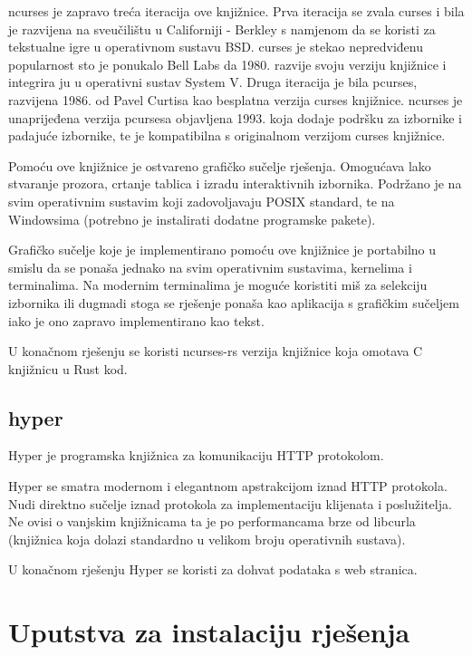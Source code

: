 \documentclass[times, utf8, zavrsni]{fer}
\begin{document}
ncurses je zapravo treća iteracija ove knjižnice. Prva iteracija se zvala
curses i bila je razvijena na sveučilištu u Californiji - Berkley s namjenom
da se koristi za tekstualne igre u operativnom sustavu BSD. curses je stekao
nepredviđenu popularnost sto je ponukalo Bell Labs da 1980. razvije svoju
verziju knjižnice i integrira ju u operativni sustav System V. Druga
iteracija je bila pcurses, razvijena 1986. od Pavel Curtisa kao besplatna
verzija curses knjižnice. ncurses je unaprijeđena verzija pcursesa objavljena
1993. koja dodaje podršku za izbornike i padajuće izbornike, te je kompatibilna
s originalnom verzijom curses knjižnice.

Pomoću ove knjižnice je ostvareno grafičko sučelje rješenja. Omogućava lako
stvaranje prozora, crtanje tablica i izradu interaktivnih izbornika. Podržano
je na svim operativnim sustavim koji zadovoljavaju POSIX standard, te na
Windowsima (potrebno je instalirati dodatne programske pakete).

Grafičko sučelje koje je implementirano pomoću ove knjižnice je portabilno u
smislu da se ponaša jednako na svim operativnim sustavima, kernelima i
terminalima. Na modernim terminalima je moguće koristiti miš za selekciju
izbornika ili dugmadi stoga se rješenje ponaša kao aplikacija s grafičkim
sučeljem iako je ono zapravo implementirano kao tekst.

U konačnom rješenju se koristi ncurses-rs \cite{ncurses_rs_repository} verzija
knjižnice koja omotava C knjižnicu u Rust kod.

\subsection{hyper}

Hyper \cite{hyper_repository} je programska knjižnica za komunikaciju HTTP
protokolom.

Hyper se smatra modernom i elegantnom apstrakcijom iznad HTTP protokola.
Nudi direktno sučelje iznad protokola za implementaciju klijenata i
poslužitelja.
Ne ovisi o vanjskim knjižnicama ta je po performancama brze od libcurla
(knjižnica koja dolazi standardno u velikom broju operativnih sustava).

U konačnom rješenju Hyper se koristi za dohvat podataka s web stranica.

\section{Uputstva za instalaciju rješenja}
\end{document}
